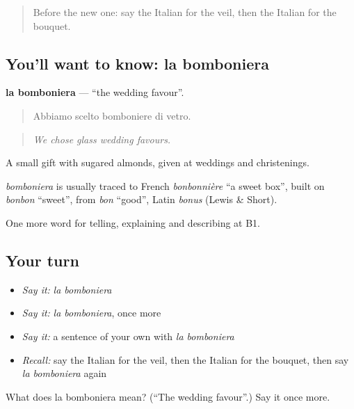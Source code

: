 \label{lesson:IT-C311-bomboniera}



\begin{quote}
Before the new one: say the Italian for the veil, then the Italian for the bouquet.
\end{quote}

\subsection*{You'll want to know: la bomboniera}
\textbf{la bomboniera} — \textquotedblleft{}the wedding favour\textquotedblright{}.

\begin{quote}
Abbiamo scelto bomboniere di vetro.
\end{quote}

\begin{quote}
\emph{We chose glass wedding favours.}
\end{quote}

A small gift with sugared almonds, given at weddings and christenings.

\begin{cousinweb}
\emph{bomboniera} is usually traced to French \emph{bonbonnière} \textquotedblleft{}a sweet box\textquotedblright{}, built on \emph{bonbon} \textquotedblleft{}sweet\textquotedblright{}, from \emph{bon} \textquotedblleft{}good\textquotedblright{}, Latin \emph{bonus} (Lewis \& Short).
\end{cousinweb}

\begin{grammarlens}[title={What you've built}]
One more word for telling, explaining and describing at B1.
\end{grammarlens}

\subsection*{Your turn}
\begin{itemize}
\raggedright
  \item \emph{Say it:} \emph{la bomboniera}
  \item \emph{Say it:} \emph{la bomboniera}, once more
  \item \emph{Say it:} a sentence of your own with \emph{la bomboniera}
  \item \emph{Recall:} say the Italian for the veil, then the Italian for the bouquet, then say \emph{la bomboniera} again
\end{itemize}

\begin{tcolorbox}[breakable,colback=teal!4,colframe=teal!35!black,title={Before you move on}]
What does la bomboniera mean? (\textquotedblleft{}The wedding favour\textquotedblright{}.) Say it once more.
\end{tcolorbox}
